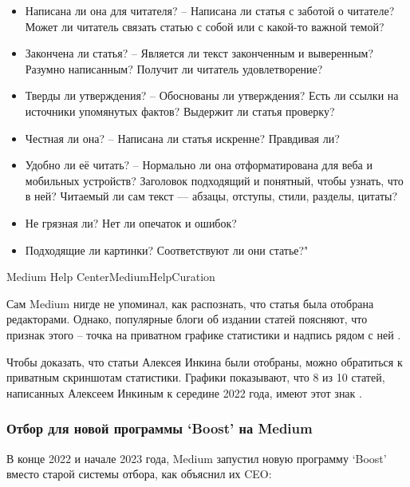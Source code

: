 {\begin{itemize}[nosep]
        \item Написана ли она для читателя? –
        Написана ли статья с заботой о читателе?
        Может ли читатель связать статью с собой или с какой-то важной темой?

        \item Закончена ли статья? –
        Является ли текст законченным и выверенным?
        Разумно написанным?
        Получит ли читатель удовлетворение?

        \item Тверды ли утверждения? –
        Обоснованы ли утверждения?
        Есть ли ссылки на источники упомянутых фактов?
        Выдержит ли статья проверку?

        \item Честная ли она? –
        Написана ли статья искренне?
        Правдивая ли?

        \item Удобно ли её читать? –
        Нормально ли она отформатирована для веба и мобильных устройств?
        Заголовок подходящий и понятный, чтобы узнать, что в ней?
        Читаемый ли сам текст — абзацы, отступы, стили, разделы, цитаты?

        \item Не грязная ли?
        Нет ли опечаток и ошибок?

        \item Подходящие ли картинки?
        Соответствуют ли они статье?"

    \end{itemize}
}{Medium Help Center}{MediumHelpCuration}

Сам Medium нигде не упоминал, как распознать, что статья была отобрана редакторами.
Однако, популярные блоги об издании статей поясняют, что признак этого --
точка на приватном графике статистики и надпись  рядом с ней
.

Чтобы доказать, что статьи Алексея Инкина были отобраны, можно обратиться к приватным скриншотам статистики.
Графики показывают, что 8 из 10 статей, написанных Алексеем Инкиным к середине 2022 года, имеют этот знак .


\subsubsection{%
    Отбор для новой программы `Boost' на Medium%
}

В конце 2022 и начале 2023 года,
Medium запустил новую программу `Boost' вместо старой системы отбора,
как объяснил их CEO:

